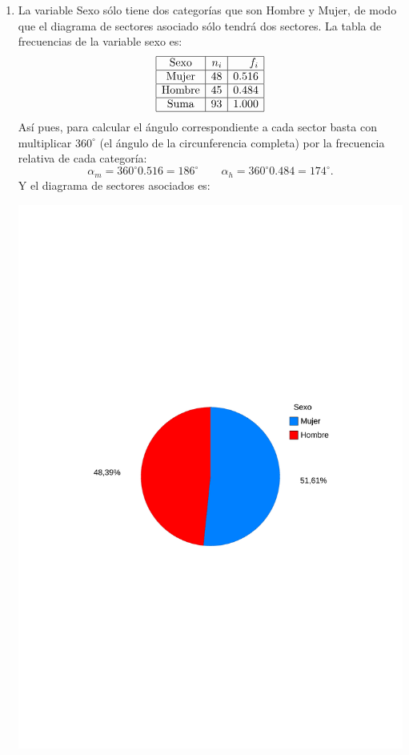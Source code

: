 {\begin{enumerate}
\item La variable Sexo sólo tiene dos categorías que son Hombre y Mujer, de modo que el diagrama de sectores asociado sólo tendrá dos sectores. La tabla de frecuencias de la variable sexo es:
\[
\begin{array}{|c|r|r|}
\hline
  \textrm{Sexo}  & n_i &   f_i \\
\hline
 \textrm{Mujer}  &  48 & 0.516 \\
\hline
 \textrm{Hombre} &  45 & 0.484 \\
\hline
  \textrm{Suma}  &  93 & 1.000 \\
\hline
\end{array}
\]
Así pues, para calcular el ángulo correspondiente a cada sector basta con multiplicar $360^{\circ}$ (el ángulo de la circunferencia completa) por la frecuencia relativa de cada categoría:
\[
\alpha_m=360^{\circ}0.516=186^{\circ}\qquad \alpha_h=360^{\circ}0.484=174^{\circ}.
\]
Y el diagrama de sectores asociados es:
\begin{center}
\includegraphics[scale=0.6]{img/sectores-des-29}
\end{center}


\end{enumerate}}
